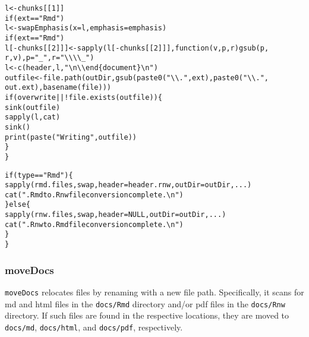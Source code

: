 \documentclass{article}\usepackage[]{graphicx}\usepackage[]{color}
\makeatletter
\newcommand{\hlnum}[1]{\textcolor[rgb]{0.863,0.196,0.184}{#1}}%
\newcommand{\hlstr}[1]{\textcolor[rgb]{0.863,0.196,0.184}{#1}}%
\newcommand{\hlopt}[1]{\textcolor[rgb]{0.576,0.631,0.631}{#1}}%
\newcommand{\hlstd}[1]{\textcolor[rgb]{0.514,0.58,0.588}{#1}}%
\newcommand{\hlkwa}[1]{\textcolor[rgb]{0.796,0.294,0.086}{#1}}%
\newcommand{\hlkwb}[1]{\textcolor[rgb]{0.522,0.6,0}{#1}}%
\newcommand{\hlkwc}[1]{\textcolor[rgb]{0.796,0.294,0.086}{#1}}%
\newcommand{\hlkwd}[1]{\textcolor[rgb]{0.576,0.631,0.631}{#1}}%
\newenvironment{kframe}{%
 \def\at@end@of@kframe{}%
 \ifinner\ifhmode%
  \def\at@end@of@kframe{\end{minipage}}%
  \begin{minipage}{\columnwidth}%
 \fi\fi%
 \def\FrameCommand##1{\hskip\@totalleftmargin \hskip-\fboxsep
 \colorbox{shadecolor}{##1}\hskip-\fboxsep
     \hskip-\linewidth \hskip-\@totalleftmargin \hskip\columnwidth}%
 \MakeFramed {\advance\hsize-\width
   \@totalleftmargin\z@ \linewidth\hsize
   \@setminipage}}%
 {\par\unskip\endMakeFramed%
 \at@end@of@kframe}
\newenvironment{knitrout}{}{} %
\makeatother
\begin{document}
\begin{knitrout}
\begin{kframe}
\begin{alltt}
        \hlstd{l} \hlkwb{<-} \hlstd{chunks[[}\hlnum{1}\hlstd{]]}
        \hlkwa{if} \hlstd{(ext} \hlopt{==} \hlstr{"Rmd"}\hlstd{)}
            \hlstd{l} \hlkwb{<-} \hlkwd{swapEmphasis}\hlstd{(}\hlkwc{x} \hlstd{= l,} \hlkwc{emphasis} \hlstd{= emphasis)}
        \hlkwa{if} \hlstd{(ext} \hlopt{==} \hlstr{"Rmd"}\hlstd{)}
            \hlstd{l[}\hlopt{-}\hlstd{chunks[[}\hlnum{2}\hlstd{]]]} \hlkwb{<-} \hlkwd{sapply}\hlstd{(l[}\hlopt{-}\hlstd{chunks[[}\hlnum{2}\hlstd{]]],} \hlkwa{function}\hlstd{(}\hlkwc{v}\hlstd{,} \hlkwc{p}\hlstd{,} \hlkwc{r}\hlstd{)} \hlkwd{gsub}\hlstd{(p,}
                \hlstd{r, v),} \hlkwc{p} \hlstd{=} \hlstr{"_"}\hlstd{,} \hlkwc{r} \hlstd{=} \hlstr{"\textbackslash{}\textbackslash{}\textbackslash{}\textbackslash{}_"}\hlstd{)}
        \hlstd{l} \hlkwb{<-} \hlkwd{c}\hlstd{(header, l,} \hlstr{"\textbackslash{}n\textbackslash{}\textbackslash{}end\{document\}\textbackslash{}n"}\hlstd{)}
        \hlstd{outfile} \hlkwb{<-} \hlkwd{file.path}\hlstd{(outDir,} \hlkwd{gsub}\hlstd{(}\hlkwd{paste0}\hlstd{(}\hlstr{"\textbackslash{}\textbackslash{}."}\hlstd{, ext),} \hlkwd{paste0}\hlstd{(}\hlstr{"\textbackslash{}\textbackslash{}."}\hlstd{,}
            \hlstd{out.ext),} \hlkwd{basename}\hlstd{(file)))}
        \hlkwa{if} \hlstd{(overwrite} \hlopt{|| !}\hlkwd{file.exists}\hlstd{(outfile)) \{}
            \hlkwd{sink}\hlstd{(outfile)}
            \hlkwd{sapply}\hlstd{(l, cat)}
            \hlkwd{sink}\hlstd{()}
            \hlkwd{print}\hlstd{(}\hlkwd{paste}\hlstd{(}\hlstr{"Writing"}\hlstd{, outfile))}
        \hlstd{\}}
    \hlstd{\}}

    \hlkwa{if} \hlstd{(type} \hlopt{==} \hlstr{"Rmd"}\hlstd{) \{}
        \hlkwd{sapply}\hlstd{(rmd.files, swap,} \hlkwc{header} \hlstd{= header.rnw,} \hlkwc{outDir} \hlstd{= outDir, ...)}
        \hlkwd{cat}\hlstd{(}\hlstr{".Rmd to .Rnw file conversion complete.\textbackslash{}n"}\hlstd{)}
    \hlstd{\}} \hlkwa{else} \hlstd{\{}
        \hlkwd{sapply}\hlstd{(rnw.files, swap,} \hlkwc{header} \hlstd{=} \hlkwa{NULL}\hlstd{,} \hlkwc{outDir} \hlstd{= outDir, ...)}
        \hlkwd{cat}\hlstd{(}\hlstr{".Rnw to .Rmd file conversion complete.\textbackslash{}n"}\hlstd{)}
    \hlstd{\}}
\hlstd{\}}
\end{alltt}
\end{kframe}
\end{knitrout}

\subsubsection{moveDocs}
\texttt{moveDocs} relocates files by renaming with a new file path.
Specifically, it scans for md and html files in the \texttt{docs/Rmd} directory and/or pdf files in the \texttt{docs/Rnw} directory.
If such files are found in the respective locations, they are moved to \texttt{docs/md}, \texttt{docs/html}, and \texttt{docs/pdf}, respectively.
\end{document}
